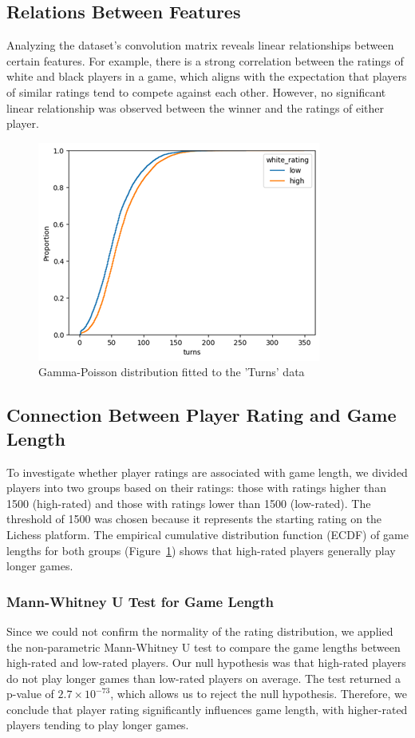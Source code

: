 \documentclass[conference]{IEEEtran}
\begin{document}
\subsection{Relations Between Features}
Analyzing the dataset’s convolution matrix reveals linear relationships between certain features. For example, there is a strong correlation between the ratings of white and black players in a game, which aligns with the expectation that players of similar ratings tend to compete against each other. However, no significant linear relationship was observed between the winner and the ratings of either player.

\begin{figure}[H]
    \centering
    \includegraphics[width=0.8\linewidth]{ratingecdf.png}
    \caption{Gamma-Poisson distribution fitted to the 'Turns' data}
    \label{fig:ecdf_plot}
\end{figure}

\subsection{Connection Between Player Rating and Game Length}
To investigate whether player ratings are associated with game length, we divided players into two groups based on their ratings: those with ratings higher than 1500 (high-rated) and those with ratings lower than 1500 (low-rated). The threshold of 1500 was chosen because it represents the starting rating on the Lichess platform. The empirical cumulative distribution function (ECDF) of game lengths for both groups (Figure~\ref{fig:ecdf_plot}) shows that high-rated players generally play longer games.

\subsubsection{Mann-Whitney U Test for Game Length}
Since we could not confirm the normality of the rating distribution, we applied the non-parametric Mann-Whitney U test to compare the game lengths between high-rated and low-rated players. Our null hypothesis was that high-rated players do not play longer games than low-rated players on average. The test returned a p-value of \(2.7 \times 10^{-73}\), which allows us to reject the null hypothesis. Therefore, we conclude that player rating significantly influences game length, with higher-rated players tending to play longer games.
\end{document}
